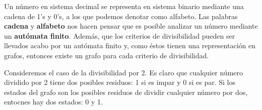 \pagebreak

Un n\'umero en sistema decimal se representa en sistema binario mediante una
cadena de 1's y 0's, a los que podemos denotar como alfabeto. Las palabras
\textbf{cadena} y \textbf{alfabeto} nos hacen pensar que es posible analizar un
n\'umero mediante un \textbf{aut\'omata finito}. Adem\'as, que los criterios de
divisibilidad pueden ser llevados acabo por un aut\'omata finito y, como \'estos
tienen una representaci\'on en grafos, entonces existe un grafo para cada
criterio de divisibilidad.

Consideremos el caso de la divisibilidad por 2. Es claro que cualquier n\'umero
dividido por 2 tiene dos posibles residuos: 1 si es impar y 0 si es par. Si los
estados del grafo son los posibles residuos de dividir cualquier n\'umero por
dos, entocnes hay dos estados: 0 y 1.

